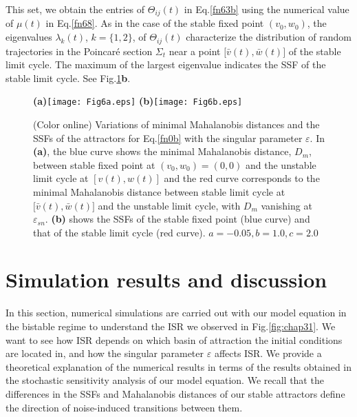 This set, we obtain the
entries of $\Theta_{ij}(t)$ in Eq.\eqref{fn63b} using the
numerical value of $\mu(t)$ in Eq.\eqref{fn68}. As in the case
of the stable fixed point $(v_0,w_0)$, the eigenvalues
$\lambda_k(t)$, $k=\{1,2\}$, of $\Theta_{ij}(t)$ characterize
the distribution of random trajectories in the Poincar\'{e}
section $\varSigma_{t}$ near a point
$\big[\bar{v}(t),\bar{w}(t)\big]$ of the stable limit cycle. The
maximum of the largest eigenvalue indicates the SSF of the stable limit cycle. See Fig.\ref{fig:chap35}\textbf{b}.
\begin{figure}%
\begin{center}
\textbf{(a)}\texttt{[image: Fig6a.eps]}
\textbf{(b)}\texttt{[image: Fig6b.eps]}
\caption{(Color online) Variations of minimal Mahalanobis distances and the SSFs
of the attractors for Eq.\eqref{fn0b} with the singular parameter $\varepsilon$.
In \textbf{(a)}, the blue curve shows the minimal Mahalanobis distance, $D_m$, between stable
fixed point at $(v_0,w_0)=(0,0)$ and the unstable limit cycle at
$[v(t),w(t)]$ and the red curve corresponds to the minimal
Mahalanobis distance between stable limit cycle at
$\big[\bar{v}(t),\bar{w}(t)\big]$ and the unstable limit cycle, with $D_m$ vanishing at $\varepsilon_{sn}$.
\textbf{(b)} shows the SSFs of the stable fixed point (blue curve) and that of the stable limit
cycle (red curve).  
$a=-0.05, b=1.0, c=2.0$} \label{fig:chap35}
\end{center}
\end{figure}

\section{Simulation results and discussion}\label{sect5}
\noindent
In this section, numerical simulations are carried out with 
our model equation in the bistable regime to understand the
ISR we observed in Fig.\ref{fig:chap31}. We want to see how  ISR depends on which 
basin of attraction the initial conditions are located in, and how  the singular parameter
$\varepsilon$ affects ISR. We provide a theoretical explanation of the 
numerical results in terms of the results obtained in the stochastic
sensitivity analysis of our model equation. We recall 
that the differences in the SSFs and Mahalanobis distances
of our stable attractors define the direction of 
noise-induced transitions between them.


